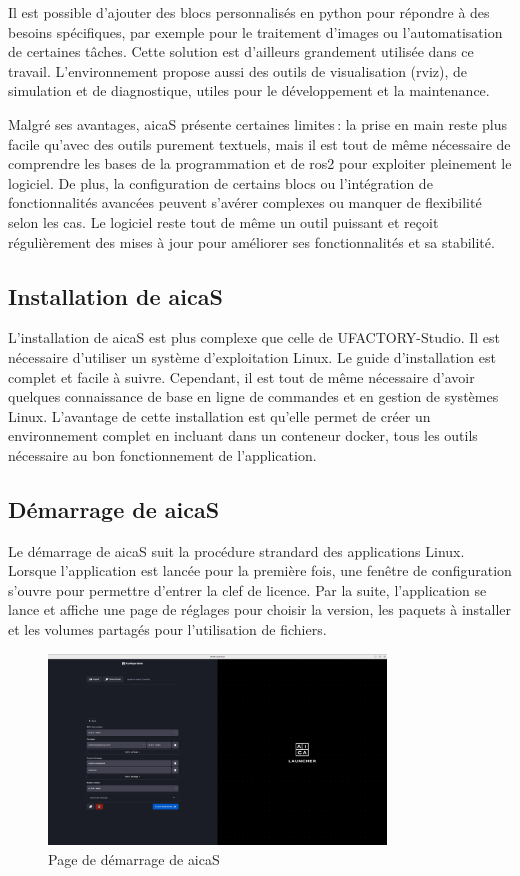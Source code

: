 Il est possible d’ajouter des blocs personnalisés en \gls{python} pour répondre à des besoins spécifiques, par exemple pour le traitement d’images ou l’automatisation de certaines tâches. Cette solution est d'ailleurs grandement utilisée dans ce travail. L’environnement propose aussi des outils de visualisation (\gls{rviz}), de simulation et de diagnostique, utiles pour le développement et la maintenance.

Malgré ses avantages, \gls{aicaS} présente certaines limites : la prise en main reste plus facile qu’avec des outils purement textuels, mais il est tout de même nécessaire de comprendre les bases de la programmation et de \gls{ros2} pour exploiter pleinement le logiciel. De plus, la configuration de certains blocs ou l’intégration de fonctionnalités avancées peuvent s’avérer complexes ou manquer de flexibilité selon les cas. Le logiciel reste tout de même un outil puissant et reçoit régulièrement des mises à jour pour améliorer ses fonctionnalités et sa stabilité.

\subsection{Installation de \gls{aicaS}}
L'installation de \gls{aicaS} est plus complexe que celle de UFACTORY-Studio. Il est nécessaire d'utiliser un système d'exploitation Linux. Le guide d'installation \cite{AICADocs} est complet et facile à suivre. Cependant, il est tout de même nécessaire d'avoir quelques connaissance de base en ligne de commandes et en gestion de systèmes Linux. L'avantage de cette installation est qu'elle permet de créer un environnement complet en incluant dans un \gls{conteneur} \gls{docker}, tous les outils nécessaire au bon fonctionnement de l'application.

\subsection{Démarrage de \gls{aicaS}}
Le démarrage de \gls{aicaS} suit la procédure strandard des applications Linux. Lorsque l'application est lancée pour la première fois, une fenêtre de configuration s'ouvre pour permettre d'entrer la clef de licence. Par la suite, l'application se lance et affiche une page de réglages pour choisir la version, les paquets à installer et les volumes partagés pour l'utilisation de fichiers.

\begin{figure}[H]
    \centering
    \includegraphics[width=0.8\textwidth]{assets/figures/AICA_Mainmenu.png}
    \caption{Page de démarrage de \gls{aicaS}}
    \label{fig:aica_startup}
\end{figure}

